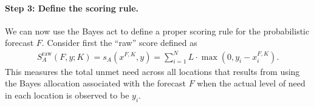 \documentclass{article}\usepackage[]{graphicx}\usepackage[]{xcolor}
\begin{document}



\paragraph{Step 3: Define the scoring rule.} We can now use the Bayes act to define a proper scoring rule for the probabilistic forecast $F$.
Consider first the ``raw'' score defined as
\begin{align}
S_A^{\text{raw}}(F, y; K) = s_A(x^{F,K}, y) = \sum_{i=1}^N L \cdot \max(0, y_i - x_i^{F,K}).
\end{align}
This measures the total unmet need across all locations that results from using the Bayes allocation associated with the forecast $F$ when the actual level of need in each location is observed to be $y_i$.
\end{document}
